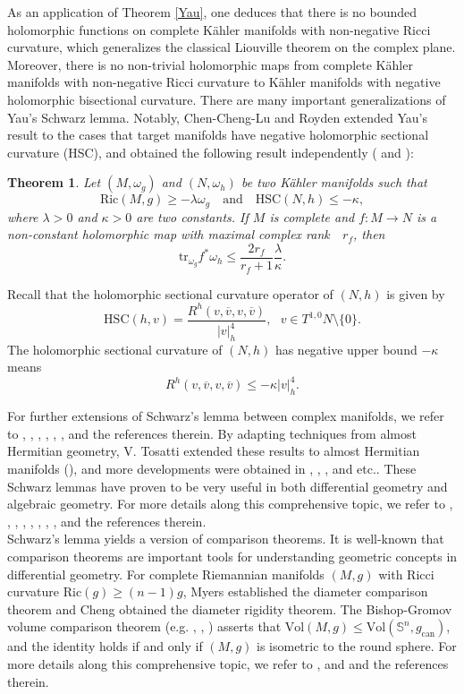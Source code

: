 \documentclass[12pt]{amsart}
\theoremstyle{plain}
\newtheorem{thm}{Theorem}[section]
\theoremstyle{definition}
\newcommand{\btheorem}{\begin{thm}}
\newcommand{\etheorem}{\end{thm}}
\renewcommand{\bar}{\overline}
\newcommand{\beq}{\begin{equation}}
\newcommand{\eeq}{\end{equation}}
\newcommand{\qtq}[1]{\quad\mbox{#1}\quad}
\renewcommand{\S}{{\mathbb S}}
\renewcommand{\>}{\rightarrow}
\newcommand{\Ric}{\mathrm{Ric}}
\newcommand{\om}{\omega}
\numberwithin{equation}{section} %
\begin{document}
\noindent As an application of Theorem \ref{Yau}, one deduces that
there is no bounded holomorphic functions on complete K\"ahler
manifolds with non-negative Ricci curvature,  which generalizes the
classical Liouville theorem on the complex plane. Moreover,  there
is no non-trivial holomorphic maps from complete K\"ahler manifolds
with non-negative Ricci curvature to K\"ahler manifolds with
negative holomorphic bisectional curvature. There are many important
generalizations of Yau's Schwarz lemma. Notably, Chen-Cheng-Lu and
Royden extended Yau's result  to the cases that target manifolds
have negative holomorphic sectional curvature (HSC), and obtained the
following result   independently (\cite{CCL79} and \cite{Roy80}):
\btheorem\label{Royden}
Let $(M,\omega_g)$ and $(N,\omega_h)$ be two K\"ahler manifolds such that
\beq
\Ric(M,g)\ge -\lambda\om_g\qtq{and}\mathrm{HSC}(N,h)\le -\kappa,
\eeq
where $\lambda>0$ and $\kappa>0$ are two constants. If $M$ is complete and $f:M\to N$ is a non-constant holomorphic map with  maximal complex rank\ \ $r_f$, then
\beq
\mathrm{tr}_{\omega_g} f^*\omega_h\le \frac{2r_f}{r_f+1}\frac{\lambda}{\kappa}.\label{formula Royden}
\eeq
\etheorem
\noindent Recall that the holomorphic sectional curvature operator of $(N,h)$ is given by
\beq \mathrm{HSC}(h, v)=\frac{R^h(v,\bar v, v,\bar v)}{|v|^4_h},\ \ \ v\in T^{1,0}N\setminus\{0\}. \eeq  The holomorphic sectional curvature of $(N,h)$ has negative upper  bound $-\kappa$ means
\beq R^h(v,\bar v, v,\bar v)\leq -\kappa |v|^4_h. \eeq
{}\baselineskip

For further extensions of Schwarz's lemma between complex manifolds,
we refer to  \cite{MY83}, \cite{Kob98}, \cite{Zhe00}, \cite{Ni19}, \cite{YZ19}, \cite{Ni21}, \cite{Bro22} and the references therein.
  By adapting techniques from almost Hermitian geometry,  V. Tosatti extended these results  to  almost Hermitian manifolds (\cite{Tos07}),
  and more developments
were obtained in \cite{Kob01}, \cite{Ma21}, \cite{Yu22},  \cite{CN22} and etc..
These Schwarz lemmas have proven to be very useful in both differential geometry and algebraic geometry.
For more details along this comprehensive topic, we refer to \cite{Liu96}, \cite{LSY04}, \cite{LTXZ16},  \cite{WY16}, \cite{TY17}, \cite{DT19}, \cite{Yan18}, \cite{CLT22}, \cite{Yan24} and the references therein.\\

Schwarz's lemma yields a version of comparison theorems.  	It is well-known that comparison theorems are  important  tools for understanding geometric concepts in differential geometry. For  complete Riemannian manifolds $(M,g)$ with Ricci curvature $\mathrm{Ric}(g)\geq (n-1)g$,
Myers \cite{Mye41} established the diameter comparison theorem  and
Cheng \cite{Che75} obtained the diameter rigidity theorem.
The Bishop-Gromov volume comparison theorem (e.g. \cite{BC64}, \cite{Gro07}, \cite{CE08}) asserts that $\mathrm{Vol}(M,g)\leq \mathrm{Vol}(\S^n,g_{\mathrm{can}})$,
and the identity holds if and only if $(M,g)$ is isometric to the round sphere. 
For more details along this comprehensive topic, we refer to \cite{CC97}, \cite{Zhu97} and \cite{Wei07} and the references therein.\\
\end{document}
